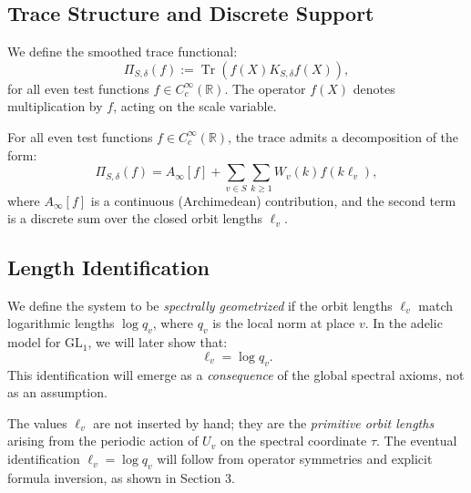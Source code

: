 \subsection{Trace Structure and Discrete Support}

We define the smoothed trace functional:
\[
\Pi_{S,\delta}(f) := \operatorname{Tr} \left( f(X) K_{S,\delta} f(X) \right),
\]
for all even test functions \( f \in C_c^\infty(\mathbb{R}) \). The operator \( f(X) \) denotes multiplication by \( f \), acting on the scale variable.

\begin{assumption}
For all even test functions \( f \in C_c^\infty(\mathbb{R}) \), the trace admits a decomposition of the form:
\[
\Pi_{S,\delta}(f) = A_\infty[f] + \sum_{v \in S} \sum_{k \geq 1} W_v(k) f(k \ell_v),
\]
where \( A_\infty[f] \) is a continuous (Archimedean) contribution, and the second term is a discrete sum over the closed orbit lengths \( \ell_v \).
\end{assumption}

\subsection{Length Identification}

We define the system to be \emph{spectrally geometrized} if the orbit lengths \( \ell_v \) match logarithmic lengths \( \log q_v \), where \( q_v \) is the local norm at place \( v \). In the adelic model for \( \mathrm{GL}_1 \), we will later show that:
\[
\ell_v = \log q_v.
\]
This identification will emerge as a \emph{consequence} of the global spectral axioms, not as an assumption.

\begin{remark}
The values \( \ell_v \) are not inserted by hand; they are the \emph{primitive orbit lengths} arising from the periodic action of \( U_v \) on the spectral coordinate \( \tau \). The eventual identification \( \ell_v = \log q_v \) will follow from operator symmetries and explicit formula inversion, as shown in Section 3.
\end{remark}
